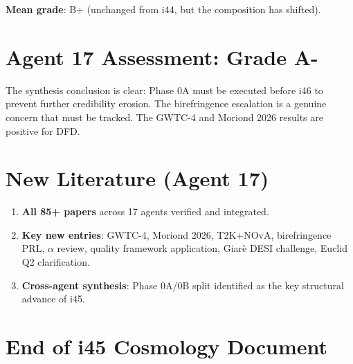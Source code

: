 \documentclass[11pt,a4paper]{article}
\begin{document}
\textbf{Mean grade}: B+ (unchanged from i44, but the composition has shifted).

\section{Agent 17 Assessment: Grade A-}

The synthesis conclusion is clear: Phase 0A must be executed before i46 to prevent further credibility erosion. The birefringence escalation is a genuine concern that must be tracked. The GWTC-4 and Moriond 2026 results are positive for DFD.

\section{New Literature (Agent 17)}

\begin{enumerate}
\item \textbf{All 85+ papers} across 17 agents verified and integrated.
\item \textbf{Key new entries}: GWTC-4, Moriond 2026, T2K+NOvA, birefringence PRL, $\alpha$ review, quality framework application, Giar\`e DESI challenge, Euclid Q2 clarification.
\item \textbf{Cross-agent synthesis}: Phase 0A/0B split identified as the key structural advance of i45.
\end{enumerate}


\section*{End of i45 Cosmology Document}
\end{document}
